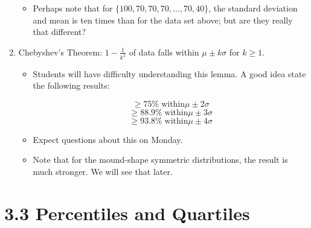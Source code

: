 \documentclass{article}
\begin{document}
\begin{enumerate}
\begin{itemize}
            \item Perhaps note that for $\{100, 70, 70, 70,\ldots,70, 40\}$, the standard deviation and mean is ten times than for the data set above; but are they really that different?
            
        \end{itemize}

    \item Chebyshev's Theorem: $1-\frac{1}{k^2}$ of data falls within $\mu\pm k \sigma$ for $k\geq 1$.
        
        \begin{itemize}
        
        \item Students will have difficulty understanding this lemma. A good idea state the following results:
        
        $$\geq 75\%\;\mbox{within} \mu \pm 2\sigma$$
        $$\geq 88.9\%\;\mbox{within} \mu \pm 3\sigma$$
        $$\geq 93.8\%\;\mbox{within} \mu \pm 4\sigma$$
        
        \item Expect questions about this on Monday.
        
        \item Note that for the mound-shape symmetric distributions, the result is much stronger. We will see that later.

        \end{itemize}

\end{enumerate}

\section*{3.3 Percentiles and Quartiles}
\end{document}
